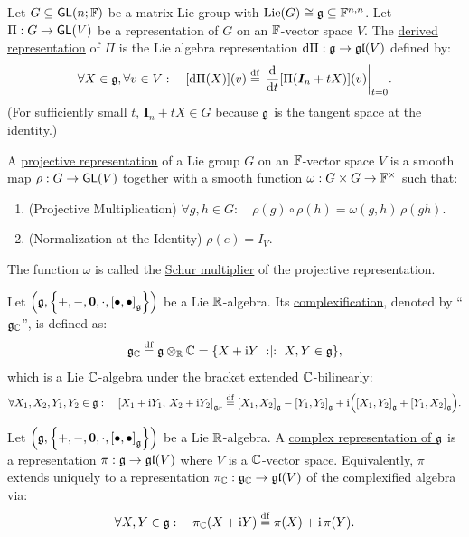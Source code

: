 \documentclass[11pt,reqno]{amsart}
\DeclareMathOperator{\Lie}{Lie}
\newcommand{\ii}{\mathrm{i}}
\begin{document}
\begin{Def}\label{def:derived-rep}
Let $G\subseteq\operatorname{\mathsf{GL}}(n;\mathbb{F})$ be a matrix Lie group with
$\Lie\Br{G}\cong\g\subseteq\F^{n,n}$.
Let $\Pi:G\to\operatorname{\mathsf{GL}}(V)$ be a representation of $G$ on an $\mathbb{F}$-vector space $V$.
The \ul{derived representation} of $\Pi$ is the Lie algebra representation
$\mathrm{d}\Pi:\mathfrak{g}\to\mathfrak{gl}(V)$ defined by:
\[
\forall X\in\g,\forall v\in V:\quad
\FUNC{\dd\Pi(X)}{v}\df
\eval{\frac{\dd}{\dd t}\FUNC{\Pi(\bm I_n + tX)}{v}}_{t=0}.
\]
(For sufficiently small $t$, $\bm I_n+tX\in G$ because $\mathfrak{g}$ is the tangent space
at the identity.)
\end{Def}


\begin{Def}
A \ul{projective representation} of a Lie group $G$ on an $\mathbb{F}$-vector space $V$
is a smooth map $\rho:G\to\operatorname{\mathsf{GL}}(V)$ together with a smooth function
$\omega:G\times G\to\mathbb{F}^\times$ such that:
\begin{enumerate}
\item (Projective Multiplication)
$\forall g,h\in G:\quad\rho(g)\circ\rho(h)=\omega(g,h)\,\rho(gh)$.
\item (Normalization at the Identity)
$\rho(e)=I_V$.
\end{enumerate}
The function $\omega$ is called the \ul{Schur multiplier}
of the projective representation.
\end{Def}

\begin{Def}
Let $\Br{\g,\set{+,-,\bm0,\cdot,\SqBr{\bullet,\bullet}_\g}}$ be a Lie $\mathbb{R}$-algebra.
Its \ul{complexification}, denoted by ``$\mathfrak{g}_{\mathbb{C}}$'', is defined as:
\[
\g_\C\df\g\otimes_\R\C
=\set{X+\ii Y\st X,Y\in\g},
\]
which is a Lie $\mathbb{C}$-algebra under the bracket extended $\mathbb{C}$-bilinearly:
\[
\forall X_1,X_2,Y_1,Y_2\in\g:\quad
\SqBr{X_1+\ii Y_1,\,X_2+\ii Y_2}_{\g_\C}
\df\SqBr{X_1,X_2}_\g-\SqBr{Y_1,Y_2}_\g
+\ii\Br{\SqBr{X_1,Y_2}_\g+\SqBr{Y_1,X_2}_\g}.
\]
\end{Def}

\begin{Def}
Let $\Br{\g,\set{+,-,\bm0,\cdot,\SqBr{\bullet,\bullet}_\g}}$ be a Lie $\mathbb{R}$-algebra.
A \ul{complex representation of $\mathfrak{g}$} is a representation
$\pi:\mathfrak{g}\to\mathfrak{gl}(V)$ where $V$ is a $\mathbb{C}$-vector space.
Equivalently, $\pi$ extends uniquely to a representation
$\pi_{\mathbb{C}}:\mathfrak{g}_{\mathbb{C}}\to\mathfrak{gl}(V)$ of the complexified algebra via:
\[
\forall X,Y\in\g:\quad
\pi_\C(X+\ii Y)\df\pi(X)+\ii\,\pi(Y).
\]
\end{Def}
\end{document}

